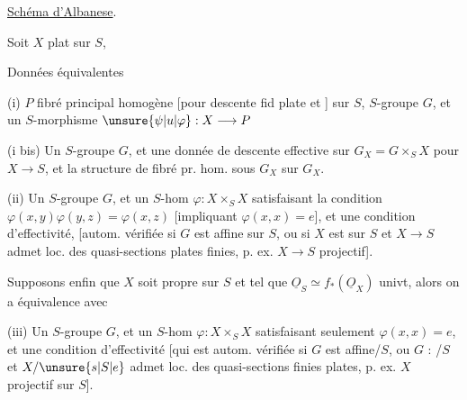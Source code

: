 \uline{Schéma d'Albanese}.

Soit $X$   plat  sur $S$, 

 Données équivalentes


(i) $P$ fibré principal homogène [pour descente fid plate et ]
sur $S$, $S$-groupe $G$, et un $S$-morphisme $\unsure{\psi|u|\varphi}:X\longrightarrow P$

(i bis) Un $S$-groupe $G$, et une donnée de descente effective sur
$G_X=G\times_S X$ pour $X\longrightarrow S$, et la structure de  fibré
pr. hom.  sous $G_X$ sur $G_X$.


(ii) Un  $S$-groupe $G$, et un $S$-hom $\varphi:X\times_S X$ satisfaisant
la condition  $\varphi(x,y)\varphi(y,z)=\varphi(x,z)$ [impliquant $\varphi(x,x)=e$],
 et une condition d'effectivité, [autom. vérifiée
si $G$ est affine sur $S$, ou si $X$ est  sur $S$
et $X\longrightarrow S$ admet loc. des quasi-sections plates finies,
p. ex. $X\longrightarrow S$ projectif].


Supposons enfin que  $X$ soit  propre sur $S$
et tel que $\underline O_S\simeq f_*(\underline O_X)$ univt, alors on a équivalence
avec

(iii) Un $S$-groupe $G$, et un $S$-hom $\varphi:X\times_S X$ satisfaisant
seulement $\varphi(x,x)=e$, et une condition d'effectivité
[qui est autom. vérifiée si $G$ est affine/$S$, ou $G$ :
/$S$ et $X/\unsure{s|S|e}$ admet loc. des quasi-sections finies
plates, p. ex. $X$ projectif sur $S$].


